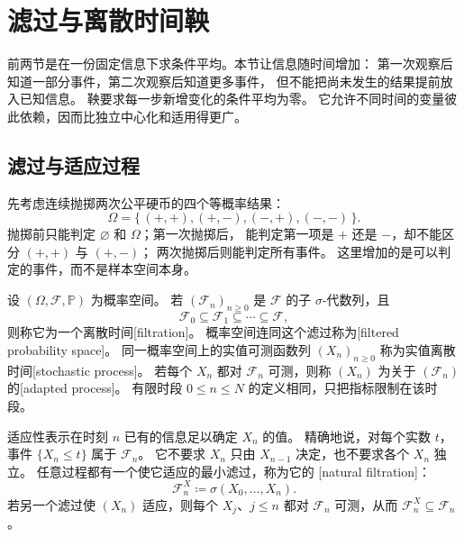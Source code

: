 \section{滤过与离散时间鞅}
\label{b1:sec:3103}

前两节是在一份固定信息下求条件平均。本节让信息随时间增加：
第一次观察后知道一部分事件，第二次观察后知道更多事件，
但不能把尚未发生的结果提前放入已知信息。
鞅要求每一步新增变化的条件平均为零。
它允许不同时间的变量彼此依赖，因而比独立中心化和适用得更广。

\subsection{滤过与适应过程}
\label{b1:subsec:310301}

先考虑连续抛掷两次公平硬币的四个等概率结果：
\[
 \Omega=\{\,(+,+),(+,-),(-,+),(-,-)\,\}.
\]
抛掷前只能判定 \(\varnothing\) 和 \(\Omega\)；第一次抛掷后，
能判定第一项是 \(+\) 还是 \(-\)，却不能区分 \((+,+)\) 与 \((+,-)\)；
两次抛掷后则能判定所有事件。
这里增加的是可以判定的事件，而不是样本空间本身。

\begin{definition}[滤过与适应过程]
\label{b1:def:filtration-31}
设 \((\Omega,\mathcal F,\mathbb P)\) 为概率空间。
若 \((\mathcal F_n)_{n\geq0}\) 是 \(\mathcal F\) 的子 \(\sigma\)-代数列，且
\[
 \mathcal F_0\subseteq\mathcal F_1\subseteq\cdots\subseteq\mathcal F,
\]
则称它为一个离散时间[filtration]。
概率空间连同这个滤过称为[filtered probability space]。
同一概率空间上的实值可测函数列 \((X_n)_{n\geq0}\)
称为实值离散时间[stochastic process]。
若每个 \(X_n\) 都对 \(\mathcal F_n\) 可测，则称 \((X_n)\)
为关于 \((\mathcal F_n)\) 的[adapted process]。
有限时段 \(0\leq n\leq N\) 的定义相同，只把指标限制在该时段。
\end{definition}

适应性表示在时刻 \(n\) 已有的信息足以确定 \(X_n\) 的值。
精确地说，对每个实数 \(t\)，事件 \(\{X_n\leq t\}\) 属于 \(\mathcal F_n\)。
它不要求 \(X_n\) 只由 \(X_{n-1}\) 决定，也不要求各个 \(X_n\) 独立。
任意过程都有一个使它适应的最小滤过，称为它的%
[natural filtration]：
\[
 \mathcal F_n^X\coloneqq\sigma(X_0,\ldots,X_n).
\]
若另一个滤过使 \((X_n)\) 适应，则每个 \(X_j\)、\(j\leq n\)
都对 \(\mathcal F_n\) 可测，从而 \(\mathcal F_n^X\subseteq\mathcal F_n\)。

